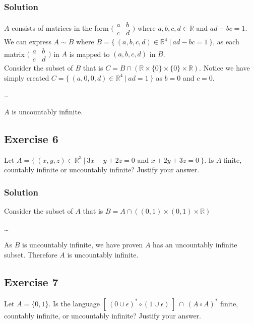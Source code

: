 \documentclass[12pt]{article}
\begin{document}
\subsubsection*{Solution}

$A$ consists of matrices in the form $\big(\begin{smallmatrix} a & b \\ c & d \end{smallmatrix}\big)$ where $a,b,c,d \in \mathbb{R}$ and $ad - bc = 1$.
We can express $A \sim B$ where $B = \{\ (a,b,c,d) \in \mathbb{R}^{4}\ |\ ad - bc = 1\ \}$,
as each matrix $\big(\begin{smallmatrix} a & b \\ c & d \end{smallmatrix}\big)$ in $A$ is mapped to $(a,b,c,d)$ in $B$.
\\
Consider the subset of $B$ that is $C = B \cap (\mathbb{R} \times \{0\} \times \{0\} \times \mathbb{R})$.
Notice we have simply created $C = \{\ (a,0,0,d) \in \mathbb{R}^{4}\ |\ ad = 1\ \}$ as $b = 0$ and $c = 0$.

\ldots

$A$ is uncountably infinite.

\subsection*{Exercise 6}

Let $A = \{\ (x,y,z) \in \mathbb{R}^{3}\ |\ 3x - y + 2z = 0$ and $x + 2y + 3z = 0\ \}$.
Is $A$ finite, countably infinite or uncountably infinite? Justify your answer.

\subsubsection*{Solution}

Consider the subset of $A$ that is $B = A \cap ((0,1) \times (0,1) \times \mathbb{R})$

\ldots

As $B$ is uncountably infinite, we have proven $A$ has an uncountably infinite subset.
Therefore $A$ is uncountably infinite.

\newpage
\subsection*{Exercise 7}

Let $A = \{ 0, 1 \}$.
Is the language $[\ {(0 \cup \epsilon)}^{*} \circ {(1 \cup \epsilon)}\ ]\ \cap\ {(A \circ A)}^{*}$ finite, countably infinite, or uncountably infinite?
Justify your answer.
\end{document}
